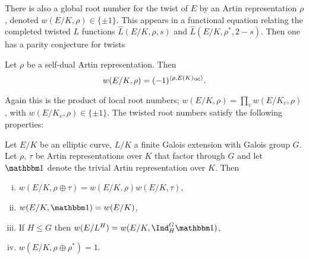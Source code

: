 \vspace{1em}
There is also a global root number for the twist of $E$ by an Artin representation $\rho$, denoted $w(E / K, \rho) \in \{ \pm 1 \}$. This appears in a functional equation relating the completed twisted $L$ functions $\hat{L}(E / K, \rho, s)$ and $\hat{L}(E / K, \rho^*, 2 - s)$. Then one has a parity conjecture for twists

\begin{conj}
   Let $\rho$ be a self-dual Artin representation. Then $$ w(E / K, \rho) = (-1)^{\langle \rho, E(K)_{\bC} \rangle}.$$
\end{conj}


Again this is the product of local root numbers; $w(E / K, \rho) = \prod_v w(E / K_v, \rho)$, with $w(E / K_v, \rho) \in \{ \pm 1\}$. The twisted root numbers satisfy the following properties:

\begin{prop}\cite[Lemma A.1, Proposition A.2]{reg-const}\label{compute-root-twist}
    Let $E / K$ be an elliptic curve, $L / K$ a finite Galois extension with Galois group $G$. Let $\rho$, $\tau$ be Artin representations over $K$ that factor through $G$ and let $\trivial$ denote the trivial Artin representation over $K$. Then
    \begin{enumerate}[(i)]
        \setlength\itemsep{0em}
        \item $w(E / K, \rho \oplus \tau) = w(E / K, \rho) w(E / K, \tau)$,
        \item $w(E / K, \trivial) = w(E/ K)$, 
        \item If $H \leq G$ then $w(E / L^H) = w(E/ K, \Ind_{H}^G \trivial)$, 
        \item $w(E / K, \rho \oplus \rho^*) = 1$.
    \end{enumerate}
    
\end{prop}